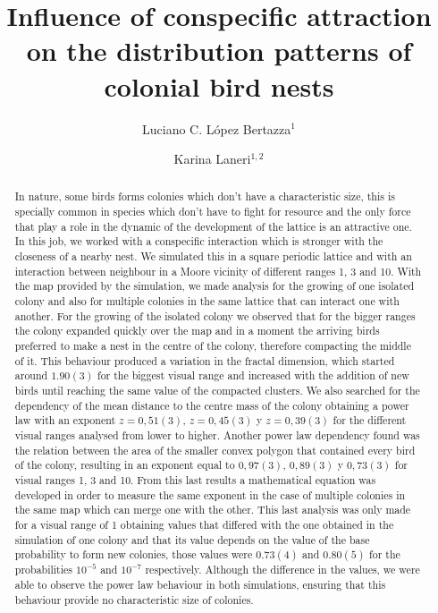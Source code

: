 \documentclass[aps,twocolumn,pre]{revtex4-2}
\begin{document}
 
\title{Influence of conspecific attraction on the distribution patterns of colonial bird nests} 

\author{Luciano C. López Bertazza$^{1}$}
\author{Karina Laneri$^{1,2}$}


\begin{abstract}

In nature, some birds forms colonies which don't have a characteristic size, this is specially common in species which don't have to fight for resource and the only force that play a role in the dynamic of the development of the lattice is an attractive one. In this job, we worked with a conspecific interaction which is stronger with the closeness of a nearby nest. We simulated this in a square periodic lattice and with an interaction between neighbour in a Moore vicinity of different ranges 1, 3 and 10. With the map provided by the simulation, we made analysis for the growing of one isolated colony and also for multiple colonies in the same lattice that can interact one with another. For the growing of the isolated colony we observed that for the bigger ranges the colony expanded quickly over the map and in a moment the arriving birds preferred to make a nest in the centre of the colony, therefore compacting the middle of it. This behaviour produced a variation in the fractal dimension, which started around $1.90(3)$ for the biggest visual range and increased with the addition of new birds until reaching the same value of the compacted clusters. We also searched for the dependency of the mean distance to the centre mass of the colony obtaining a power law with an exponent $z = 0{,}51(3)$, $z = 0{,}45(3)$ y $z = 0{,}39(3)$ for the different visual ranges analysed from lower to higher. Another power law dependency found was the relation between the area of the smaller convex polygon that contained every bird of the colony, resulting in an exponent equal to $0{,}97(3)$, $0{,}89(3)$ y $0{,}73(3)$ for visual ranges 1, 3 and 10. From this last results a mathematical equation was developed in order to measure the same exponent in the case of multiple colonies in the same map which can merge one with the other. This last analysis was only made for a visual range of 1 obtaining values that differed with the one obtained in the simulation of one colony and that its value depends on the value of the base probability to form new colonies, those values were $0.73(4)$ and $0.80(5)$ for the probabilities $10^{-5}$ and $10^{-7}$ respectively. Although the difference in the values, we were able to observe the power law behaviour in both simulations, ensuring that this behaviour provide no characteristic size of colonies.

\end{abstract}
\end{document}

